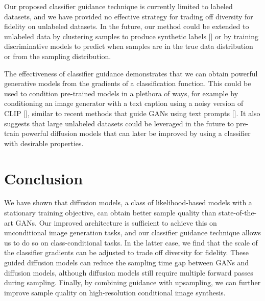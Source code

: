 Our proposed classifier guidance technique is currently limited to labeled datasets, and we have provided no effective strategy for trading off diversity for fidelity on unlabeled datasets. In the future, our method could be extended to unlabeled data by clustering samples to produce synthetic labels [] or by training discriminative models to predict when samples are in the true data distribution or from the sampling distribution.

The effectiveness of classifier guidance demonstrates that we can obtain powerful generative models from the gradients of a classification function. This could be used to condition pre-trained models in a plethora of ways, for example by conditioning an image generator with a text caption using a noisy version of CLIP [], similar to recent methods that guide GANs using text prompts []. It also suggests that large unlabeled datasets could be leveraged in the future to pre-train powerful diffusion models that can later be improved by using a classifier with desirable properties.

\section{Conclusion}
\label{sec:conclusion}
We have shown that diffusion models, a class of likelihood-based models with a stationary training objective, can obtain better sample quality than state-of-the-art GANs. Our improved architecture is sufficient to achieve this on unconditional image generation tasks, and our classifier guidance technique allows us to do so on class-conditional tasks. In the latter case, we find that the scale of the classifier gradients can be adjusted to trade off diversity for fidelity. These guided diffusion models can reduce the sampling time gap between GANs and diffusion models, although diffusion models still require multiple forward passes during sampling. Finally, by combining guidance with upsampling, we can further improve sample quality on high-resolution conditional image synthesis. 


